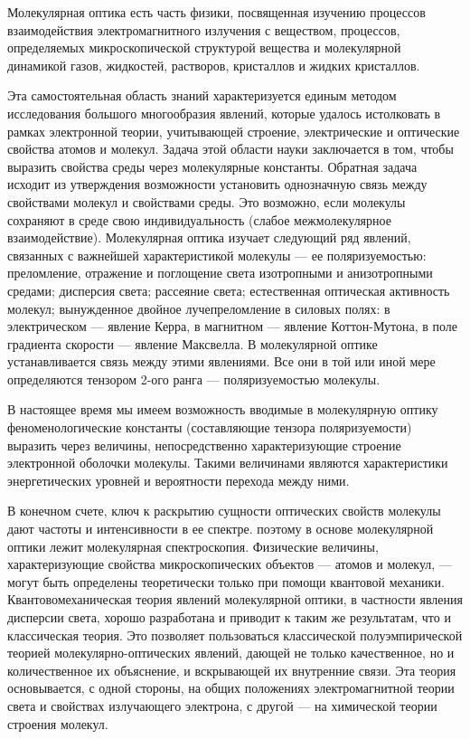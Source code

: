 ﻿

\vskip 2mm

Молекулярная оптика есть часть физики, посвященная изучению
процессов взаимодействия электромагнитного излучения с веществом,
процессов, определяемых микроскопической структурой вещества и
молекулярной динамикой газов, жидкостей, растворов,
кристаллов и жидких кристаллов.

Эта самостоятельная область знаний характеризуется единым методом
исследования большого многообразия явлений, которые удалось
истолковать в рамках электронной теории, учитывающей строение,
электрические и оптические свойства атомов и молекул. Задача этой
области науки заключается в том, чтобы выразить свойства среды
через молекулярные константы. Обратная задача исходит из
утверждения возможности установить однозначную связь между
свойствами молекул и свойствами среды. Это возможно, если
молекулы сохраняют в среде свою индивидуальность (слабое
межмолекулярное взаимодействие). Молекулярная оптика изучает
следующий ряд явлений, связанных с важнейшей характеристикой
молекулы --- ее поляризуемостью: преломление, отражение и
поглощение света изотропными и анизотропными средами;
дисперсия света; рассеяние света; естественная оптическая
активность молекул; вынужденное двойное лучепреломление в силовых
полях: в электрическом --- явление Керра, в магнитном --- явление
Коттон-Мутона, в поле градиента скорости --- явление Максвелла. В
молекулярной оптике устанавливается связь между этими явлениями.
Все они в той или иной мере определяются тензором 2-ого ранга ---
поляризуемостью молекулы.

В настоящее время мы имеем возможность вводимые в молекулярную
оптику феноменологические константы (составляющие тензора
поляризуемости) выразить через величины, непосредственно
характеризующие строение электронной оболочки молекулы. Такими
величинами являются характеристики энергетических уровней и
вероятности перехода между ними.

В конечном счете, ключ к раскрытию сущности оптических свойств
молекулы дают частоты и интенсивности в ее спектре. поэтому в
основе молекулярной оптики лежит молекулярная спектроскопия.
Физические величины, характеризующие свойства микроскопических
объектов --- атомов и молекул, --- могут быть определены
теоретически только при помощи квантовой механики.
Квантовомеханическая теория явлений молекулярной оптики, в
частности явления дисперсии света, хорошо разработана и приводит
к таким же результатам, что и классическая теория. Это позволяет
пользоваться классической полуэмпирической теорией
молекулярно-оптических явлений, дающей не только качественное, но
и количественное их объяснение, и вскрывающей их внутренние
связи. Эта теория основывается, с одной стороны, на общих
положениях электромагнитной теории света и свойствах
излучающего электрона, с другой --- на химической теории строения
молекул.

